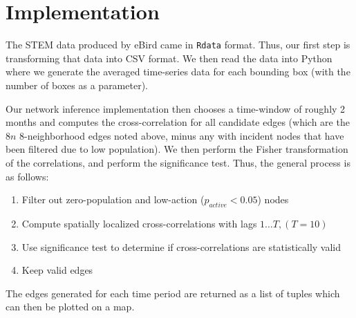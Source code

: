 \section{Implementation}
The STEM data produced by eBird came in \texttt{Rdata} format. Thus, our first step is transforming that data into CSV format. We then read the data into Python where we generate the averaged time-series data for each bounding box (with the number of boxes as a parameter). 

Our network inference implementation then chooses a time-window of roughly 2 months and computes the cross-correlation for all candidate edges (which are the $8n$ 8-neighborhood edges noted above, minus any with incident nodes that have been filtered due to low population). We then perform the Fisher transformation of the correlations, and perform the significance test. Thus, the general process is as follows:

\begin{enumerate}
\item Filter out zero-population and low-action ($p_{active} < 0.05$) nodes
\item Compute spatially localized cross-correlations with lags $1\dots T, (T=10)$
\item Use significance test to determine if cross-correlations are statistically valid
\item Keep valid edges
\end{enumerate}

The edges generated for each time period are returned as a list of tuples which can then be plotted on a map.

